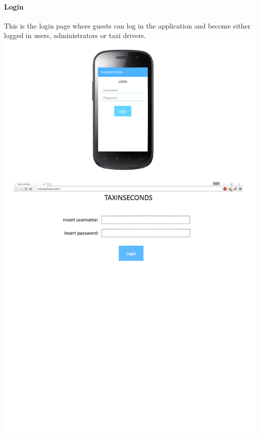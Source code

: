 \documentclass{article}
\begin{document}
\paragraph{Login}
This is the login page where guests can log in the application and become either logged in users, administrators or taxi drivers.
\includegraphics{Login interface}
\clearpage
\end{document}

